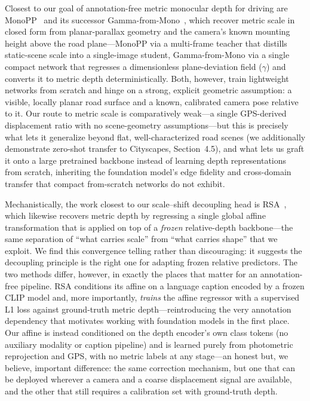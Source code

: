 Closest to our goal of annotation-free metric monocular depth for driving are MonoPP~\cite{elazab2025monopp} and its successor Gamma-from-Mono~\cite{elazab2025gamma}, which recover metric scale in closed form from planar-parallax geometry and the camera's known mounting height above the road plane---MonoPP via a multi-frame teacher that distills static-scene scale into a single-image student, Gamma-from-Mono via a single compact network that regresses a dimensionless plane-deviation field (\(\gamma\)) and converts it to metric depth deterministically. Both, however, train lightweight networks from scratch and hinge on a strong, explicit geometric assumption: a visible, locally planar road surface and a known, calibrated camera pose relative to it. Our route to metric scale is comparatively weak---a single GPS-derived displacement ratio with no scene-geometry assumptions---but this is precisely what lets it generalize beyond flat, well-characterized road scenes (we additionally demonstrate zero-shot transfer to Cityscapes, Section~4.5), and what lets us graft it onto a large pretrained backbone instead of learning depth representations from scratch, inheriting the foundation model's edge fidelity and cross-domain transfer that compact from-scratch networks do not exhibit.

Mechanistically, the work closest to our scale--shift decoupling head is RSA~\cite{zeng2024rsa}, which likewise recovers metric depth by regressing a single global affine transformation that is applied on top of a \emph{frozen} relative-depth backbone---the same separation of ``what carries scale'' from ``what carries shape'' that we exploit. We find this convergence telling rather than discouraging: it suggests the decoupling principle is the right one for adapting frozen relative predictors. The two methods differ, however, in exactly the places that matter for an annotation-free pipeline. RSA conditions its affine on a language caption encoded by a frozen CLIP model and, more importantly, \emph{trains} the affine regressor with a supervised L1 loss against ground-truth metric depth---reintroducing the very annotation dependency that motivates working with foundation models in the first place. Our affine is instead conditioned on the depth encoder's own class tokens (no auxiliary modality or caption pipeline) and is learned purely from photometric reprojection and GPS, with no metric labels at any stage---an honest but, we believe, important difference: the same correction mechanism, but one that can be deployed wherever a camera and a coarse displacement signal are available, and the other that still requires a calibration set with ground-truth depth.

